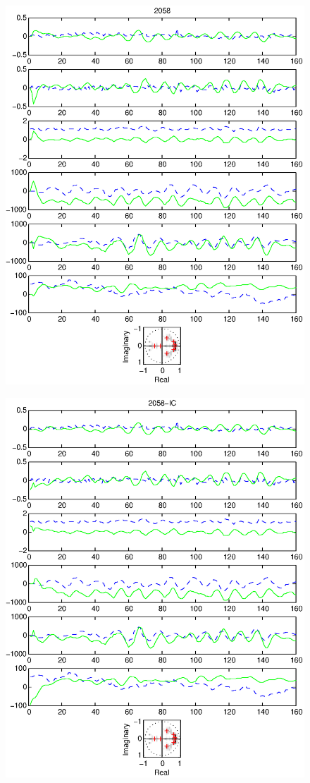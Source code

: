 \documentclass{article}
\begin{document}
\begin{figure}[htb!]\centering
\includegraphics{2058.eps}
\end{figure}\clearpage
\begin{figure}[htb!]\centering
\includegraphics{2058_ic.eps}
\end{figure}\clearpage
\end{document}
